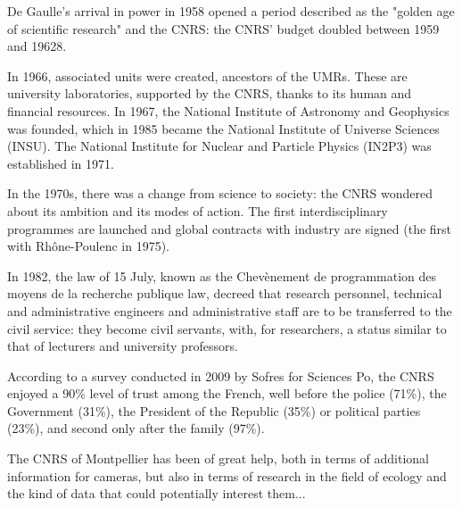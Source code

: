 De Gaulle's arrival in power in 1958 opened a period described as the "golden age of scientific research" and the CNRS: the CNRS' budget doubled between 1959 and 19628.

In 1966, associated units were created, ancestors of the UMRs. These are university laboratories, supported by the CNRS, thanks to its human and financial resources. In 1967, the National Institute of Astronomy and Geophysics was founded, which in 1985 became the National Institute of Universe Sciences (INSU). The National Institute for Nuclear and Particle Physics (IN2P3) was established in 1971.

In the 1970s, there was a change from science to society: the CNRS wondered about its ambition and its modes of action. The first interdisciplinary programmes are launched and global contracts with industry are signed (the first with Rhône-Poulenc in 1975).

In 1982, the law of 15 July, known as the Chevènement de programmation des moyens de la recherche publique law, decreed that research personnel, technical and administrative engineers and administrative staff are to be transferred to the civil service: they become civil servants, with, for researchers, a status similar to that of lecturers and university professors.

According to a survey conducted in 2009 by Sofres for Sciences Po, the CNRS enjoyed a 90\% level of trust among the French, well before the police (71\%), the Government (31\%), the President of the Republic (35\%) or political parties (23\%), and second only after the family (97\%).

The CNRS of Montpellier has been of great help, both in terms of additional information for cameras, but also in terms of research in the field of ecology and the kind of data that could potentially interest them...